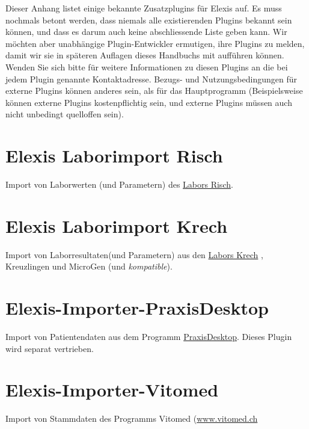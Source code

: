 
Dieser Anhang listet einige bekannte Zusatzplugins für Elexis auf. Es muss nochmals betont werden, dass niemals alle existierenden Plugins bekannt sein können, und dass es darum auch keine abschliessende Liste geben kann. Wir möchten aber unabhängige Plugin-Entwickler ermutigen, ihre Plugins zu melden, damit wir sie in späteren Auflagen dieses Handbuchs mit aufführen können.
Wenden Sie sich bitte für weitere Informationen zu diesen Plugins an die bei jedem Plugin genannte Kontaktadresse. Bezugs- und Nutzungsbedingungen für externe Plugins können anderes sein, als für das Hauptprogramm (Beispielsweise können externe Plugins kostenpflichtig sein, und externe Plugins müssen auch nicht unbedingt quelloffen sein).


\section{Elexis Laborimport Risch}

Import von Laborwerten (und Parametern) des \href{http://www.risch.ch}{Labors Risch}.

\section{Elexis Laborimport Krech}

Import von Laborresultaten(und Parametern) aus den \href{http://www.labor.ch}{Labors Krech} , Kreuzlingen und MicroGen (und \textit{kompatible}).

\section{Elexis-Importer-PraxisDesktop}

Import von Patientendaten aus dem Programm \href{http://www.praxisdesktop.ch}{PraxisDesktop}. Dieses Plugin wird separat vertrieben.


 \section{Elexis-Importer-Vitomed}

 Import von Stammdaten des Programms Vitomed (\href{http://www.vitomed.ch}{www.vitomed.ch}




